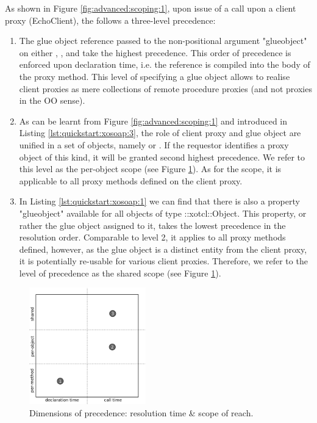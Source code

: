 As shown in Figure \ref{fig:advanced:scoping:1}, upon issue of a call upon a client proxy (EchoClient), the  follows a three-level precedence:
\begin{enumerate}
\item The glue object reference passed to the non-positional argument "glueobject" on either , ,  and  take the highest precedence. This order of precedence is enforced upon declaration time, i.e. the reference is compiled into the body of the proxy method. This level of specifying a glue object allows to realise client proxies as mere collections of remote procedure proxies (and not proxies in the OO sense).
\item As can be learnt from Figure \ref{fig:advanced:scoping:1} and introduced in Listing \ref{lst:quickstart:xosoap:3}, the role of client proxy and glue object are unified in a set of objects, namely  or  . If the requestor identifies a proxy object of this kind, it will be granted second highest precedence. We refer to this level as the per-object scope (see Figure \ref{fig:advanced:scoping:2}). As for the scope, it is applicable to all proxy methods defined on the client proxy.
\item In Listing \ref{lst:quickstart:xosoap:1} we can find that there is also a property "glueobject" available for all objects of type ::xotcl::Object. This property, or rather the glue object assigned to it, takes the lowest precedence in the resolution order. Comparable to level 2, it applies to all proxy methods defined, however, as the glue object is a distinct entity from the client proxy, it is potentially re-usable for various client proxies. Therefore, we refer to the level of precedence as the shared scope (see Figure \ref{fig:advanced:scoping:2}).
\end{enumerate}
  \begin{figure}[htbp]
\begin{center}
\includegraphics[width=0.45\textwidth]{img/scoping-glue-objects-scheme.png}
\caption{Dimensions of precedence: resolution time \& scope of reach.}
\label{fig:advanced:scoping:2}
\end{center}
\end{figure}
